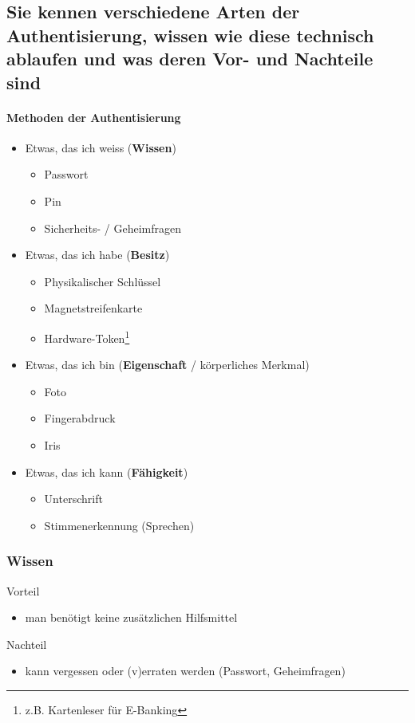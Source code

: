 \documentclass[10pt,a4paper]{article}
\begin{document}
\subsection*{Sie kennen verschiedene Arten der Authentisierung, wissen wie diese technisch ablaufen und was deren Vor- und Nachteile sind}
\paragraph*{Methoden der Authentisierung}
\begin{itemize}[noitemsep,topsep=0pt,leftmargin=*]
    \item Etwas, das ich weiss (\textbf{Wissen})
    \begin{itemize}[noitemsep,topsep=0pt,leftmargin=*]
        \item Passwort
        \item Pin
        \item Sicherheits- / Geheimfragen
    \end{itemize}
    \item Etwas, das ich habe (\textbf{Besitz})
    \begin{itemize}[noitemsep,topsep=0pt,leftmargin=*]
        \item Physikalischer Schlüssel
        \item Magnetstreifenkarte
        \item Hardware-Token\footnote{z.B. Kartenleser für E-Banking}
    \end{itemize}
    \item Etwas, das ich bin (\textbf{Eigenschaft} / körperliches Merkmal)
    \begin{itemize}[noitemsep,topsep=0pt,leftmargin=*]
        \item Foto
        \item Fingerabdruck
        \item Iris
    \end{itemize}
    \item Etwas, das ich kann (\textbf{Fähigkeit})
    \begin{itemize}[noitemsep,topsep=0pt,leftmargin=*]
        \item Unterschrift
        \item Stimmenerkennung (Sprechen)
    \end{itemize}
\end{itemize}

\subsubsection*{Wissen}
Vorteil
\begin{itemize}[noitemsep,topsep=0pt,leftmargin=*]
    \item man benötigt keine zusätzlichen Hilfsmittel
\end{itemize}
Nachteil
\begin{itemize}[noitemsep,topsep=0pt,leftmargin=*]
    \item kann vergessen oder (v)erraten werden (Passwort, Geheimfragen)
\end{itemize}
\end{document}
